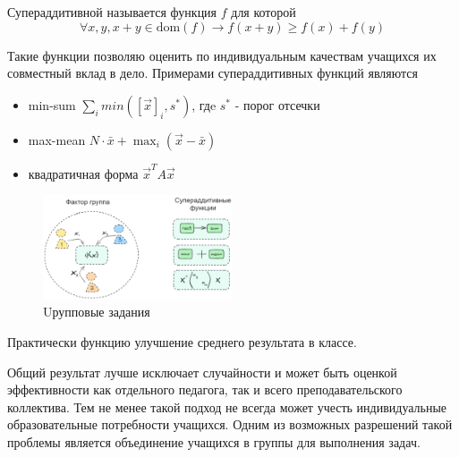 Супераддитивной называется функция $f$ для которой
\begin{equation}
    \forall x, y, x+y \in \text{dom}(f) \rightarrow f(x+y) \ge f(x) +f(y) 
\end{equation}

Такие функции позволяю оценить по индивидуальным качествам учащихся их совместный вклад в дело. Примерами супераддитивных функций являются \begin{itemize}
    \item min-sum $\sum_{i} min([\vec{x}]_i,s^*)$, гдe $s^*$ - порог отсечки
    \item max-mean $N \cdot \bar{x} + \max_i(\vec{x} - \bar{x})$
    \item квадратичная форма $\vec{x}^T A \vec{x}$
\end{itemize}

\begin{figure}[h]
    \centering
    \includegraphics[width=0.5\textwidth]{assets/final/group.excalidraw.png}
    \caption{Uрупповые задания}
    \label{group_task}
\end{figure}

Практически функцию улучшение среднего результата в классе. 

Общий результат лучше исключает
случайности и может быть оценкой эффективности как отдельного педагога, так и всего преподавательского коллектива.
Тем не менее такой подход не всегда может учесть индивидуальные образовательные потребности учащихся. Одним из возможных
разрешений такой проблемы является объединение учащихся в группы для выполнения задач.














